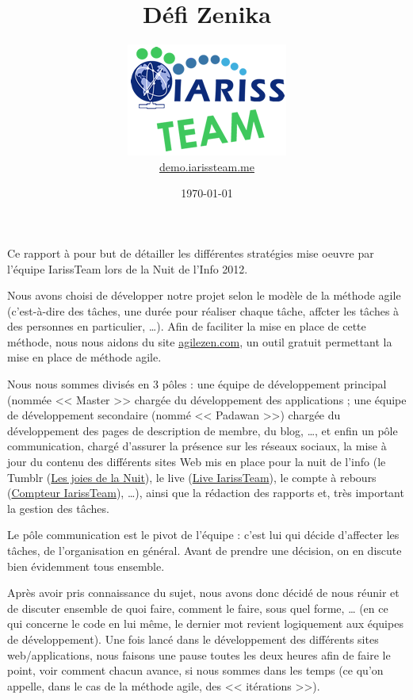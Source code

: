 \documentclass[12pt, a4paper]{article}
\title{Défi Zenika}
\newcommand{\espace}{\vspace{.8cm}}
\begin{document}
\author{\includegraphics{../_img/iariss_team.png} \\ {\sffamily \href{http://demo.iarissteam.me}{demo.iarissteam.me}}}
\date{\today}

\maketitle{}

{\sffamily Ce rapport à pour but de détailler les différentes stratégies mise oeuvre par l'équipe IarissTeam lors de la Nuit de l'Info 2012.} 

\espace{}
Nous avons choisi de développer notre projet selon le modèle de la méthode agile (c'est-à-dire des tâches, une durée pour réaliser chaque tâche, affcter les tâches à des personnes en particulier, \ldots{}). Afin de faciliter la mise en place de cette méthode, nous nous aidons du site \href{http://www.agilezen.com/}{agilezen.com}, un outil gratuit permettant la mise en place de méthode agile.

Nous nous sommes divisés en 3 pôles : une équipe de développement principal (nommée << Master >> chargée du développement des applications ; une équipe de développement secondaire (nommé << Padawan >>) chargée du développement des pages de description de membre, du blog, \ldots{},  et enfin un pôle communication, chargé d'assurer la présence sur les réseaux sociaux, la mise à jour du contenu des différents sites Web mis en place pour la nuit de l'info (le Tumblr (\href{http://lesjoiesdelanuit.tumblr.com/}{Les joies de la Nuit}), le live (\href{http://live.iarissteam.me/}{Live IarissTeam}), le compte à rebours (\href{http://iarissteam.me/}{Compteur IarissTeam}), \ldots{}), ainsi que la rédaction des rapports et, très important la gestion des tâches.

\espace{}
Le pôle communication est le pivot de l'équipe : c'est lui qui décide d'affecter les tâches, de l'organisation en général. Avant de prendre une décision, on en discute bien évidemment tous ensemble.

Après avoir pris connaissance du sujet, nous avons donc décidé de nous réunir et de discuter ensemble de quoi faire, comment le faire, sous quel forme, \ldots{} (en ce qui concerne le code en lui même, le dernier mot revient logiquement aux équipes de développement). Une fois lancé dans le développement des différents sites web/applications, nous faisons une pause toutes les deux heures afin de faire le point, voir comment chacun avance, si nous sommes dans les temps (ce qu'on appelle, dans le cas de la méthode agile, des << itérations >>).
\end{document}

